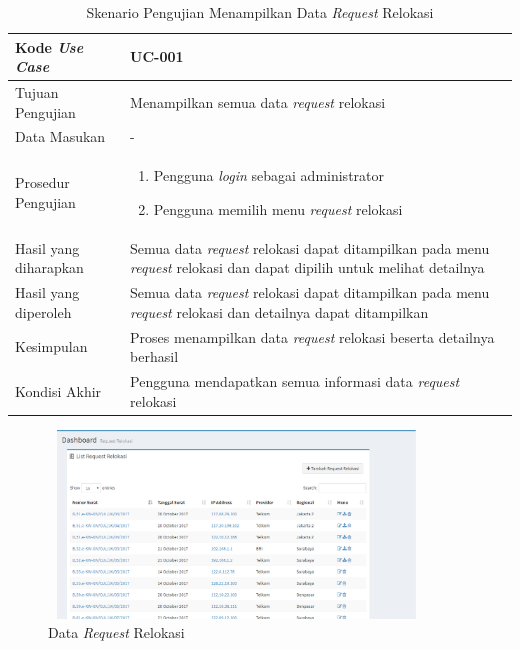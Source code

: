 \begin{table}[h!]
	\centering
	\begin{tabular}{|p{4cm}|p{6cm}|}
	\hline
	Kode \textit{Use Case} & UC-001\\ \hline
	Tujuan Pengujian & Menampilkan semua data \textit{request} relokasi\\ \hline
	Data Masukan & - \\ \hline
	Prosedur Pengujian & 
		\begin{enumerate}
		\item Pengguna \textit{login} sebagai administrator
		\item Pengguna memilih menu \textit{request} relokasi
		\end{enumerate}\\ \hline
	Hasil yang diharapkan & Semua data \textit{request} relokasi dapat ditampilkan pada menu \textit{request} relokasi dan dapat dipilih untuk melihat detailnya \\ \hline
	Hasil yang diperoleh & Semua data \textit{request} relokasi dapat ditampilkan pada menu \textit{request} relokasi dan detailnya dapat ditampilkan\\ \hline
	Kesimpulan & Proses menampilkan data \textit{request} relokasi beserta detailnya berhasil\\ \hline
	Kondisi Akhir & Pengguna mendapatkan semua informasi data \textit{request} relokasi\\ \hline
	\end{tabular}\caption{Skenario Pengujian Menampilkan Data \textit{Request} Relokasi}
	\label{tab:list_req_relokasi}
\end{table}

\begin{figure}[h!]
\centerline
{\includegraphics[width=10cm,height=5cm]{bab6/listReqRelokasi.png}}
\caption{Data \textit{Request} Relokasi}
\label{figure:data_req_relokasi}
\end{figure}

